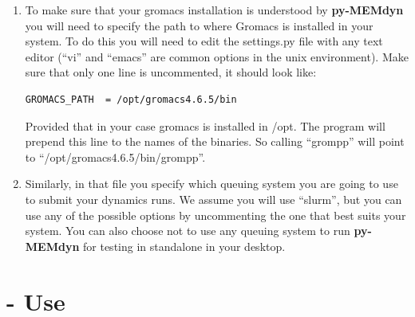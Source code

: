 \documentclass[10pt, oneside, pdftex]{article}
\begin{document}
\begin{enumerate}
\item{To make  sure that  your gromacs  installation is  understood by
  \textbf{py-MEMdyn}  you  will need  to  specify  the path  to  where
  Gromacs is  installed in your  system. To do  this you will  need to
  edit the settings.py file with any text editor (``vi'' and ``emacs''
  are common options in the unix environment). Make sure that only one
  line    is    uncommented, it should look  like:
\lstset{language=python, frame=single}
\begin{Verbatim}
GROMACS_PATH  = /opt/gromacs4.6.5/bin 
\end{Verbatim}
Provided that in  your case gromacs is installed in  /opt. The program
will   prepend  this line to the names of the binaries.  So   calling
``grompp'' will point to ``/opt/gromacs4.6.5/bin/grompp''.}

\item{Similarly, in that file you specify which queuing system you are
  going to  use to submit your  dynamics runs.  We  assume you will
  use  ``slurm'', but  you  can use  any of  the  possible options  by
  uncommenting  the one  that best  suits your  system.  You  can also
  choose not to  use any queuing system to  run \textbf{py-MEMdyn} for
  testing in standalone in your desktop.}
\end{enumerate}

\section*{ - Use}
\end{document}
